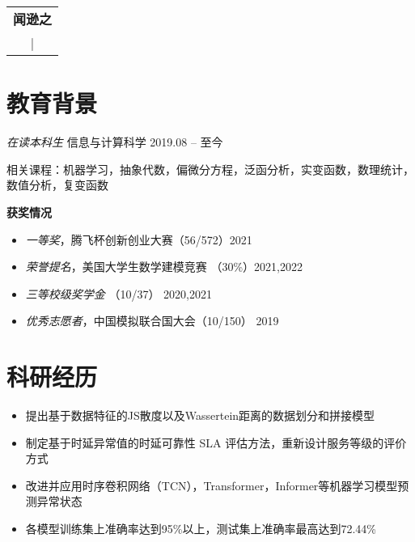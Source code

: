 \documentclass{resume}
\begin{document}
\begin{table}
  \centering
  \begin{tabu}{ c }
    \centering
    \textbf{\huge{闻逊之}}   \\
     |  \\
  \end{tabu}
\end{table}

\vspace{2pt}
\section{教育背景}
\textit{在读本科生} \quad 信息与计算科学 \hfill{2019.08 -- 至今}

相关课程：机器学习，抽象代数，偏微分方程，泛函分析，实变函数，数理统计，数值分析，复变函数

\textbf{获奖情况}
\begin{itemize}
  \item \textit{一等奖}，腾飞杯创新创业大赛（56/572）\hfill 2021
  \item \textit{荣誉提名}，美国大学生数学建模竞赛 （30\%）\hfill 2021,2022
  \item \textit{三等校级奖学金} （10/37） \hfill 2020,2021
  \item \textit{优秀志愿者}，中国模拟联合国大会（10/150） \hfill 2019
\end{itemize}

\section{科研经历}


\begin{itemize}
  \item 提出基于数据特征的JS散度以及Wassertein距离的数据划分和拼接模型
  \item 制定基于时延异常值的时延可靠性 SLA 评估方法，重新设计服务等级的评价方式
  \item 改进并应用时序卷积网络（TCN），Transformer，Informer等机器学习模型预测异常状态
  \item 各模型训练集上准确率达到95\%以上，测试集上准确率最高达到72.44\%
\end{itemize}
\end{document}
